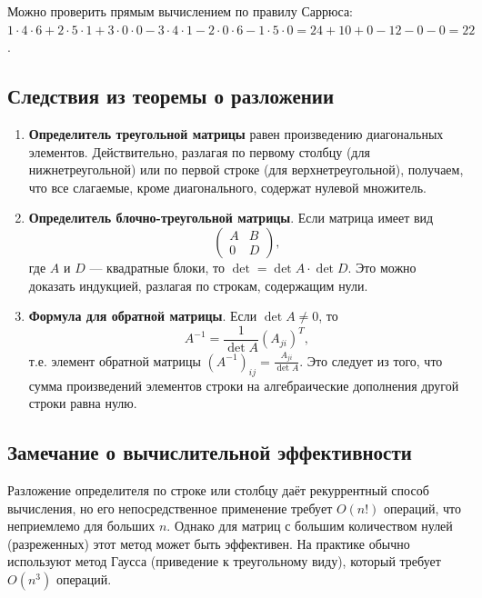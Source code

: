 \documentclass[a4paper,12pt]{article}
\theoremstyle{definition}
\theoremstyle{plain}
\theoremstyle{remark}
\begin{document}
	Можно проверить прямым вычислением по правилу Саррюса: \( 1\cdot4\cdot6 + 2\cdot5\cdot1 + 3\cdot0\cdot0 - 3\cdot4\cdot1 - 2\cdot0\cdot6 - 1\cdot5\cdot0 = 24 + 10 + 0 - 12 - 0 - 0 = 22 \).
	
	\subsection{Следствия из теоремы о разложении}
	
	\begin{enumerate}
		\item \textbf{Определитель треугольной матрицы} равен произведению диагональных элементов. Действительно, разлагая по первому столбцу (для нижнетреугольной) или по первой строке (для верхнетреугольной), получаем, что все слагаемые, кроме диагонального, содержат нулевой множитель.
		
		\item \textbf{Определитель блочно-треугольной матрицы}. Если матрица имеет вид
		\[
		\begin{pmatrix}
			A & B \\
			0 & D
		\end{pmatrix},
		\]
		где \( A \) и \( D \) — квадратные блоки, то \( \det = \det A \cdot \det D \). Это можно доказать индукцией, разлагая по строкам, содержащим нули.
		
		\item \textbf{Формула для обратной матрицы}. Если \( \det A \neq 0 \), то
		\[
		A^{-1} = \frac{1}{\det A} (A_{ji})^T,
		\]
		т.е. элемент обратной матрицы \( (A^{-1})_{ij} = \frac{A_{ji}}{\det A} \). Это следует из того, что сумма произведений элементов строки на алгебраические дополнения другой строки равна нулю.
	\end{enumerate}
	
	\subsection{Замечание о вычислительной эффективности}
	
	Разложение определителя по строке или столбцу даёт рекуррентный способ вычисления, но его непосредственное применение требует \( O(n!) \) операций, что неприемлемо для больших \( n \). Однако для матриц с большим количеством нулей (разреженных) этот метод может быть эффективен. На практике обычно используют метод Гаусса (приведение к треугольному виду), который требует \( O(n^3) \) операций.
	
	
	
\end{document}
